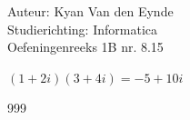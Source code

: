 \documentclass[a4paper]{article}
\begin{document}
  
\noindent \large Auteur: Kyan Van den Eynde \\
\noindent \large Studierichting: Informatica\\
\noindent \large Oefeningenreeks 1B nr. 8.15\\

\medskip

\normalsize

$(1+2i)(3+4i) = -5 + 10i$\\

\begin{thebibliography}{999}
\end{thebibliography}
\end{document}
